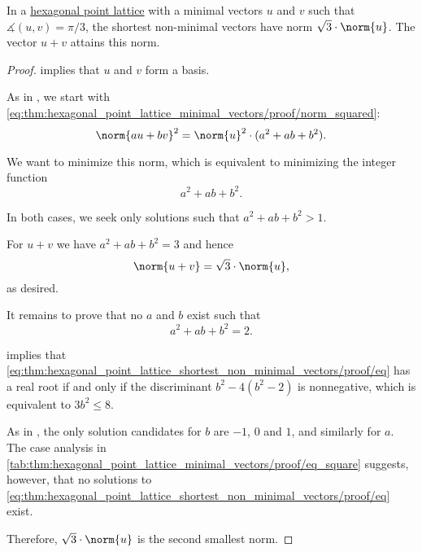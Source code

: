 \begin{proposition}\label{thm:hexagonal_point_lattice_shortest_non_minimal_vectors}
  In a \hyperref[def:hexagonal_point_lattice]{hexagonal point lattice} with a minimal vectors \( u \) and \( v \) such that \( \measuredangle(u, v) = \pi / 3 \), the shortest non-minimal vectors have norm \( \sqrt 3 \cdot \norm{u} \). The vector \( u + v \) attains this norm.
\end{proposition}
\begin{proof}
   implies that \( u \) and \( v \) form a basis.

  As in , we start with \eqref{eq:thm:hexagonal_point_lattice_minimal_vectors/proof/norm_squared}:
  \begin{equation*}
    \norm{au + bv}^2 = \norm{u}^2 \cdot (a^2 + ab + b^2).
  \end{equation*}

  We want to minimize this norm, which is equivalent to minimizing the integer function
  \begin{equation}\label{eq:thm:hexagonal_point_lattice_shortest_non_minimal_vectors/proof/min}
    a^2 + ab + b^2.
  \end{equation}

  In both cases, we seek only solutions such that \( a^2 + ab + b^2 > 1 \).

  For \( u + v \) we have \( a^2 + ab + b^2 = 3 \) and hence
  \begin{equation*}
    \norm{u + v} = \sqrt 3 \cdot \norm{u},
  \end{equation*}
  as desired.

  It remains to prove that no \( a \) and \( b \) exist such that
  \begin{equation}\label{eq:thm:hexagonal_point_lattice_shortest_non_minimal_vectors/proof/eq}
    a^2 + ab + b^2 = 2.
  \end{equation}

   implies that \eqref{eq:thm:hexagonal_point_lattice_shortest_non_minimal_vectors/proof/eq} has a real root if and only if the discriminant \( b^2 - 4(b^2 - 2) \) is nonnegative, which is equivalent to \( 3b^2 \leq 8 \).

  As in , the only solution candidates for \( b \) are \( -1 \), \( 0 \) and \( 1 \), and similarly for \( a \). The case analysis in \cref{tab:thm:hexagonal_point_lattice_minimal_vectors/proof/eq_square} suggests, however, that no solutions to \eqref{eq:thm:hexagonal_point_lattice_shortest_non_minimal_vectors/proof/eq} exist.

  Therefore, \( \sqrt 3 \cdot \norm{u} \) is the second smallest norm.
\end{proof}
